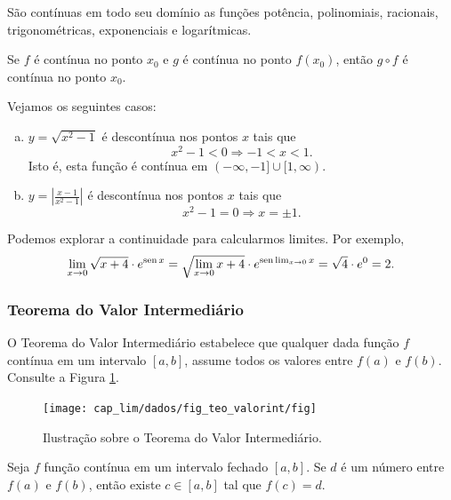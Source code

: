 \begin{obs}
  São contínuas em todo seu domínio as funções potência, polinomiais, racionais, trigonométricas, exponenciais e logarítmicas.
\end{obs}

Se $f$ é contínua no ponto $x_0$ e $g$ é contínua no ponto $f(x_0)$, então $g\circ f$ é contínua no ponto $x_0$.

\begin{ex}
  Vejamos os seguintes casos:
  \begin{enumerate}[a)]
  \item $y = \sqrt{x^2-1}$ é descontínua nos pontos $x$ tais que
    \begin{equation}
      x^2-1<0\Rightarrow -1<x<1.
    \end{equation}
    Isto é, esta função é contínua em $(-\infty,-1]\cup[1,\infty)$.
  \item $\displaystyle y = \left|\frac{x-1}{x^2-1}\right|$ é descontínua nos pontos $x$ tais que
    \begin{equation}
      x^2-1=0\Rightarrow x=\pm 1.
    \end{equation}
  \end{enumerate}
\end{ex}

\begin{ex}
  Podemos explorar a continuidade para calcularmos limites. Por exemplo,
  \begin{equation}
    \lim_{x\to 0} \sqrt{x+4}\cdot e^{\operatorname{sen} x} = \sqrt{\lim_{x\to 0} x+4}\cdot e^{\operatorname{sen} \lim_{x\to 0} x} = \sqrt{4}\cdot e^{0} = 2.
  \end{equation}
\end{ex}

\subsubsection{Teorema do Valor Intermediário}

O Teorema do Valor Intermediário estabelece que qualquer dada função $f$ contínua em um intervalo $[a, b]$, assume todos os valores entre $f(a)$ e $f(b)$. Consulte a Figura \ref{fig:teo_valorint}.

\begin{figure}[H]
  \centering
  \texttt{[image: cap\_lim/dados/fig\_teo\_valorint/fig]}
  \caption{Ilustração sobre o Teorema do Valor Intermediário.}
  \label{fig:teo_valorint}
\end{figure}

\begin{teo}\label{teo:valorintermediario}
  Seja $f$ função contínua em um intervalo fechado $[a, b]$. Se $d$ é um número entre $f(a)$ e $f(b)$, então existe $c\in [a, b]$ tal que $f(c)=d$.
\end{teo}



